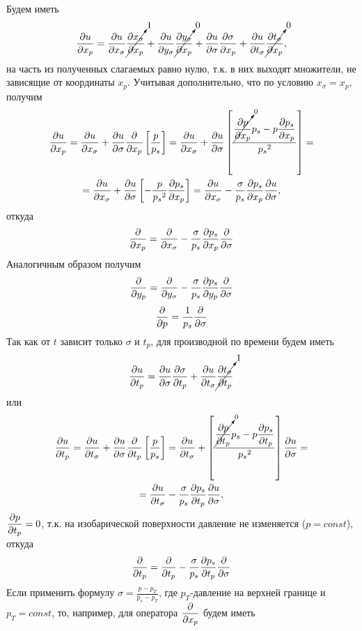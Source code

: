 Будем иметь
\begin{equation*}
    \pd{u}{x_p}=
     \pd{u}{x_{\sigma}} \cancelto{1}{ \pd{x_{\sigma}}{x_p} }+
    \pd{u}{y_{\sigma}}\cancelto{0}{\pd{y_{\sigma}}{x_p}}+
    \pd{u}{\sigma}\pd{\sigma}{x_p}+
    \pd{u}{t_{\sigma}}\cancelto{0}{\pd{t_{\sigma}}{x_p}},  
\end{equation*}
на часть из полученных слагаемых равно нулю, т.к. в них выходят множители, не зависящие от координаты $x_p$. Учитывая дополнительно, что по условию $x_{\sigma}=x_p$, получим
\begin{multline*}
    \pd{u}{x_p}=\pd{u}{x_{\sigma}}+
        \pd{u}{\sigma}\pd{}{x_p} \left[ \frac{p}{p_s} \right] = 
        \pd{u}{x_{\sigma}}+
        \pd{u}{\sigma} \left[ \frac{ \cancelto{0}{\pd{p}{x_p}}p_s - p\pd{p_s}{x_p} } { {p_s}^2 } \right] = \\
        = \pd{u}{x_{\sigma}} + 
        \pd{u}{\sigma} \left[ -\frac{p}{{p_s}^2} \pd{p_s}{x_p} \right] = 
        \pd{u}{x_{\sigma}} - \frac{\sigma}{p_s}\pd{p_s}{x_p}\pd{u}{\sigma},
\end{multline*}
откуда
\begin{equation}
    \label{eq:sigma2px}
    \pd{}{x_p}=\pd{}{x_{\sigma}}-\frac{\sigma}{p_s}\pd{p_s}{x_p}\pd{}{\sigma}
\end{equation}
Аналогичным образом получим 
\begin{equation}
    \label{eq:sigma2py}
    \pd{}{y_p}=\pd{}{y_{\sigma}}-\frac{\sigma}{p_s}\pd{p_s}{y_p}\pd{}{\sigma}
\end{equation}
\begin{equation}
    \label{eq:sigma2pp}
    \pd{}{p}= \frac{1}{p_s}\pd{}{\sigma}
\end{equation}
Так как от $t$ зависит только $\sigma$ и $t_p$, для производной по времени будем иметь
\begin{equation*}
    \pd{u}{t_p}=
    \pd{u}{\sigma}\pd{\sigma}{t_p}+
    \pd{u}{t_{\sigma}} \cancelto{1}{\pd{t_{\sigma}}{t_p}} %
\end{equation*}
 или
 \begin{multline*}
    \pd{u}{t_p}=\pd{u}{t_{\sigma}}+
        \pd{u}{\sigma}\pd{}{t_p} \left[ \frac{p}{p_s} \right] = 
        \pd{u}{t_{\sigma}} + 
        \left[ \frac{ \cancelto{0}{\pd{p}{t_p}}p_s - 
        p\pd{p_s}{t_p} } { {p_s}^2 } \right] \pd{u}{\sigma} = \\
        = \pd{u}{t_{\sigma}} - 
        \frac{\sigma}{p_s}\pd{p_s}{t_p}\pd{u}{\sigma},
\end{multline*}
$\pd{p}{t_p}=0$, т.к. на изобарической поверхности давление не изменяется ($p=const$), откуда
\begin{equation}
    \label{eq:sigma2pt}
    \pd{}{t_p}= \pd{}{t_p} - \frac{\sigma}{p_s} \pd{p_s}{t_p} \pd{}{\sigma}
\end{equation}
Если применить формулу $\sigma=\frac{p-p_T}{p_s-p_T}$, где $p_T$-давление на верхней границе и $p_T=const$, то, например, для оператора $\pd{}{x_p}$ будем иметь


